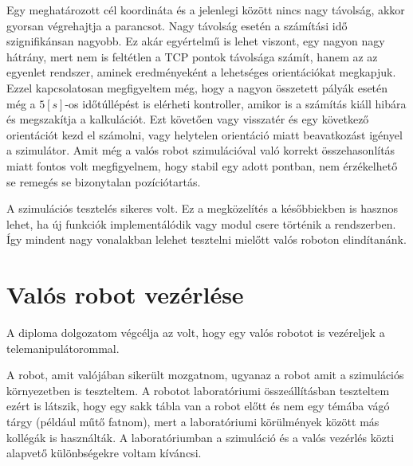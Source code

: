 Egy meghatározott cél koordináta és a jelenlegi között nincs nagy távolság, akkor gyorsan végrehajtja a parancsot. Nagy távolság esetén a számítási idő szignifikánsan nagyobb. Ez akár egyértelmű is lehet viszont, egy nagyon nagy hátrány, mert nem is feltétlen a TCP pontok távolsága számít, hanem az az egyenlet rendszer, aminek eredményeként a lehetséges orientációkat megkapjuk. Ezzel kapcsolatosan megfigyeltem még, hogy a nagyon összetett pályák esetén még a $5[s]$-os időtúllépést is elérheti kontroller, amikor is a számítás kiáll hibára és megszakítja a kalkulációt. Ezt követően vagy visszatér és egy következő orientációt kezd el számolni, vagy helytelen orientáció miatt beavatkozást igényel a szimulátor. Amit még a valós robot szimulációval való korrekt összehasonlítás miatt fontos volt megfigyelnem, hogy stabil egy adott pontban, nem érzékelhető se remegés se bizonytalan pozíciótartás.

A szimulációs tesztelés sikeres volt. Ez a megközelítés a későbbiekben is hasznos lehet, ha új funkciók implementálódik vagy modul csere történik a rendszerben. Így mindent nagy vonalakban lelehet tesztelni mielőtt valós roboton elindítanánk.


\section{Valós robot vezérlése}

A diploma dolgozatom végcélja az volt, hogy egy valós robotot is vezéreljek a telemanipulátorommal. 

A robot, amit valójában sikerült mozgatnom, ugyanaz a robot amit a szimulációs környezetben is teszteltem. A robotot laboratóriumi összeállításban teszteltem ezért is látszik, hogy egy sakk tábla van a robot előtt és nem egy témába vágó tárgy (például műtő fatnom), mert a laboratóriumi körülmények között más kollégák is használták. A laboratóriumban a szimuláció és a valós vezérlés közti alapvető különbségekre voltam kíváncsi.

